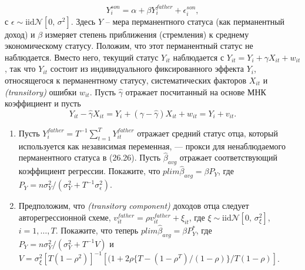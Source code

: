 \begin{enumerate}
\begin{equation}
Y^{son}_i=\alpha + \beta Y^{father}_i + \epsilon^{son}_i,
\end{equation}
с $\epsilon \sim \text{iid} \mathcal{N}[0,\, \sigma^2]$. Здесь $Y$ – мера перманентного статуса (как перманентный доход) и $\beta$ измеряет степень приближения (стремления) к среднему экономическому статусу. Положим, что этот перманентный статус не наблюдается. Вместо него, текущий статус $Y_{it}$ наблюдается с $Y_{it}=Y_i+ \gamma X_{it}+ w_{it}$, так что $Y_{it}$  состоит из индивидуального фиксированного эффекта $Y_{i}$, относящегося к перманентному статусу, систематических факторов $X_{it}$ и \emph{(transitory)} ошибки $w_{it}$. Пусть $\widehat{\gamma}$ отражает посчитанный на основе МНК коэффициент и пусть
\[
Y_{it}-\widehat{\gamma}X_{it}= Y_i+ (\gamma - \widehat{\gamma})X_{it} + w_{it} = Y_i + v_{it}.
\]
\begin{enumerate}
\item Пусть $Y^{father}_i=T^{-1} \sum \limits^{T}_{t=1}Y^{father}_{it}$ отражает средний статус отца, который используется как независимая переменная, --- прокси для ненаблюдаемого перманентного статуса в (26.26). Пусть $\widehat{\beta}_{avg}$ отражает соответствующий коэффициент регрессии. Покажите, что $plim \widehat{\beta}_{avg}=\beta P_Y$, где $P_Y=n\sigma^2_Y/(\sigma^2_Y+T^{-1} \sigma^2_{\epsilon})$.
\item Предположим, что \emph{(transitory component)} доходов отца следует авторегрессионной схеме, $v^{father}_{it}=\rho v^{father}_{it}+\xi_{it}$, где $\xi \sim \text{iid} \mathcal{N}[0,\, \sigma^2_{\xi}]$, $i=1,\dots ,T$. Покажите, что теперь $plim \widehat{\beta}_{avg}=\beta P^*_Y$, где $P_Y=n\sigma^2_Y/(\sigma^2_Y+T^{-1} V)$ и $V=\sigma^2_{\xi}[T(1-\rho^2)]^{-1}[(1+2\rho\{ T-(1-\rho^T)/(1-\rho) \} /T(1-\rho)]$.
\end{enumerate}
\end{enumerate} 


